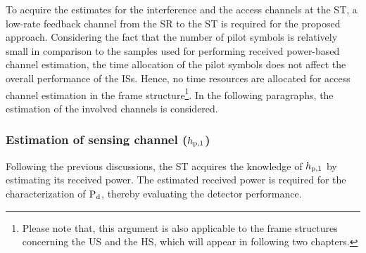 To acquire the estimates for the interference and the access channels at the ST, a low-rate feedback channel from the SR to the ST is required for the proposed approach. 
Considering the fact that the number of pilot symbols is relatively small in comparison to the samples used for performing received power-based channel estimation, the time allocation of the pilot symbols does not affect the overall performance of the ISs. Hence, no time resources are allocated for access channel estimation in the frame structure\footnote{Please note that, this argument is also applicable to the frame structures concerning the US and the HS, which will appear in following two chapters.}. In the following paragraphs, the estimation of the involved channels is considered. 


\subsubsection{Estimation of sensing channel ($h_{\text{p,1}}$)}
Following the previous discussions, the ST acquires the knowledge of $h_{\text{p,1}}$ by estimating its received power. The estimated received power is required for the characterization of $\text{P}_{\text{d}}$, thereby evaluating the detector performance. %

